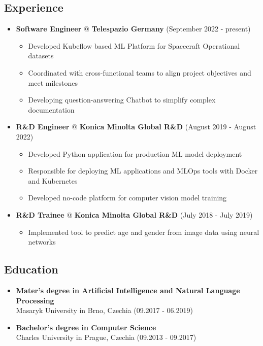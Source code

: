 \documentclass[a4paper,12pt]{article}
\begin{document}
{\color{myblue}
\subsection*{Experience}\label{work}
}
\begin{itemize}
\item
  \textbf{Software Engineer} @ \textbf{Telespazio Germany} \hfill (September 2022 - present)
  \begin{itemize}
      \item Developed Kubeflow based ML Platform for Spacecraft Operational datasets
      \item Coordinated with cross-functional teams to align project objectives and meet milestones
      \item Developing question-answering Chatbot to simplify complex documentation
  \end{itemize}
\item
  \textbf{R\&D Engineer} @ \textbf{Konica Minolta Global R\&D} \hfill (August 2019 - August 2022)
  \begin{itemize}
      \item Developed Python application for production ML model deployment
      \item Responsible for deploying ML applications and MLOps tools with Docker and Kubernetes
      \item Developed no-code platform for computer vision model training
  \end{itemize}
\item
  \textbf{R\&D Trainee} @ \textbf{Konica Minolta Global R\&D} \hfill (July 2018 - July 2019)
  \begin{itemize}
      \item Implemented tool to predict age and gender from image data using neural networks
  \end{itemize}
\end{itemize}

{\color{myblue}
\subsection*{Education}\label{education}
}
\begin{itemize}
\item
  \textbf{Mater's degree in Artificial Intelligence and Natural Language Processing}\\
  Masaryk University in Brno, Czechia \hfill (09.2017 - 06.2019)
\item
  \textbf{Bachelor's degree in Computer Science}\\
  Charles University in Prague, Czechia \hfill (09.2013 - 09.2017)
\end{itemize}
\end{document}
